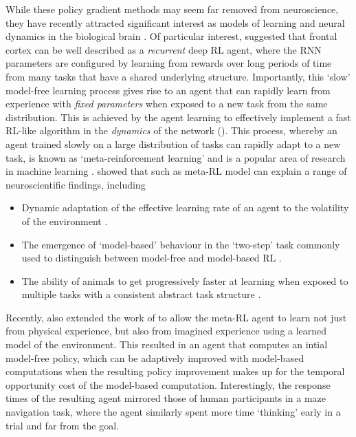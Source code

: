 While these policy gradient methods may seem far removed from neuroscience, they have recently attracted significant interest as models of learning and neural dynamics in the biological brain \citep{wang2018prefrontal, jensen2023recurrent, merel2019deep}.
Of particular interest, \citet{wang2018prefrontal} suggested that frontal cortex can be well described as a \emph{recurrent} deep RL agent, where the RNN parameters are configured by learning from rewards over long periods of time from many tasks that have a shared underlying structure.
Importantly, this `slow' model-free learning process gives rise to an agent that can rapidly learn from experience with \emph{fixed parameters} when exposed to a new task from the same distribution.
This is achieved by the agent learning to effectively implement a fast RL-like algorithm in the \emph{dynamics} of the network ().
This process, whereby an agent trained slowly on a large distribution of tasks can rapidly adapt to a new task, is known as `meta-reinforcement learning' and is a popular area of research in machine learning \citep{finn2017model, ritter2018been, duan2016rl, wang2016learning}.
\citet{wang2018prefrontal} showed that such as meta-RL model can explain a range of neuroscientific findings, including
\begin{itemize}
    \item Dynamic adaptation of the effective learning rate of an agent to the volatility of the environment \citep{behrens2007learning}.
    \item The emergence of `model-based' behaviour in the `two-step' task commonly used to distinguish between model-free and model-based RL \citep{miller2017dorsal,daw2011model}.
    \item The ability of animals to get progressively faster at learning when exposed to multiple tasks with a consistent abstract task structure \citep{harlow1949formation}.
\end{itemize}
Recently, \citet{jensen2023recurrent} also extended the work of \citet{wang2018prefrontal} to allow the meta-RL agent to learn not just from physical experience, but also from imagined experience using a learned model of the environment.
This resulted in an agent that computes an intial model-free policy, which can be adaptively improved with model-based computations when the resulting policy improvement makes up for the temporal opportunity cost of the model-based computation.
Interestingly, the response times of the resulting agent mirrored those of human participants in a maze navigation task, where the agent similarly spent more time `thinking' early in a trial and far from the goal.

